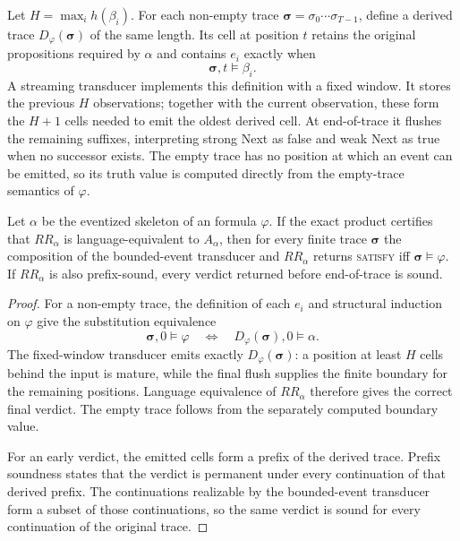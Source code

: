 Let $H=\max_i h(\beta_i)$.  For each non-empty trace
$\boldsymbol{\sigma}=\sigma_0\cdots\sigma_{T-1}$, define a derived trace
$D_\varphi(\boldsymbol{\sigma})$ of the same length.  Its cell at position $t$
retains the original propositions required by $\alpha$ and contains $e_i$
exactly when
\[
    \boldsymbol{\sigma},t\models\beta_i.
\]
A streaming transducer implements this definition with a fixed window.  It
stores the previous $H$ observations; together with the current observation,
these form the $H+1$ cells needed to emit the oldest derived cell.  At
end-of-trace it flushes the remaining suffixes, interpreting strong Next as
false and weak Next as true when no successor exists.  The empty trace has no
position at which an event can be emitted, so its truth value is computed
directly from the empty-trace semantics of $\varphi$.

\begin{theorem}
\label{thm:rulerunner-bounded-correct}
Let $\alpha$ be the eventized skeleton of an \ltlf formula $\varphi$.  If the
exact product certifies that $RR_\alpha$ is language-equivalent to
$A_\alpha$, then for every finite trace $\boldsymbol{\sigma}$ the composition
of the bounded-event transducer and $RR_\alpha$ returns \textsc{satisfy} iff
$\boldsymbol{\sigma}\models\varphi$.  If $RR_\alpha$ is also prefix-sound,
every verdict returned before end-of-trace is sound.
\end{theorem}

\begin{proof}
For a non-empty trace, the definition of each $e_i$ and structural induction on
$\varphi$ give the substitution equivalence
\[
    \boldsymbol{\sigma},0\models\varphi
    \quad\Longleftrightarrow\quad
    D_\varphi(\boldsymbol{\sigma}),0\models\alpha.
\]
The fixed-window transducer emits exactly
$D_\varphi(\boldsymbol{\sigma})$: a position at least $H$ cells behind the
input is mature, while the final flush supplies the finite boundary for the
remaining positions.  Language equivalence of $RR_\alpha$ therefore gives the
correct final verdict.  The empty trace follows from the separately computed
boundary value.

For an early verdict, the emitted cells form a prefix of the derived trace.
Prefix soundness states that the verdict is permanent under every continuation
of that derived prefix.  The continuations realizable by the bounded-event
transducer form a subset of those continuations, so the same verdict is sound
for every continuation of the original trace.
\end{proof}


